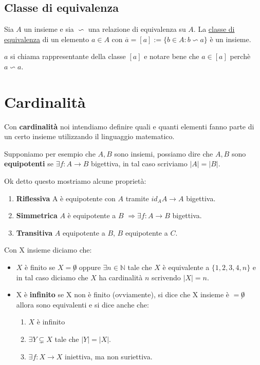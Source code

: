 \documentclass{article}
\theoremstyle{definition}
\begin{document}
\subsection{Classe di equivalenza}
Sia $A$ un insieme e sia $\backsim$ una relazione di equivalenza su $A$. La \underline{classe di equivalenza} di un elemento $a \in A$ con $\overline{a} = [a] := \{b\in A : b \backsim a\}$ è un insieme. \par
$a$ si chiama rappresentante della classe $[a]$ e notare bene che $a \in [a]$ perchè $a \backsim a$.






\newpage
\section{Cardinalità}
Con \textbf{cardinalità} noi intendiamo definire quali e quanti elementi fanno parte di un certo insieme utilizzando il linguaggio matematico. \par

Supponiamo per esempio che $A,B$ sono insiemi, possiamo dire che $A,B$ sono \textbf{equipotenti} se $\exists f:A \rightarrow B$ bigettiva, in tal caso scriviamo $|A| = |B|$. \par

Ok detto questo mostriamo alcune proprietà:
\begin{enumerate}
        \item \textbf{Riflessiva} A è equipotente con $A$ tramite $id_A A \rightarrow A$ bigettiva.
        \item \textbf{Simmetrica} $A$ è equipotente a $B$ $\Rightarrow \exists f:A \rightarrow B$ bigettiva. 
        \item \textbf{Transitiva} $A$ equipotente a $B$, $B$ equipotente a $C$.	
\end{enumerate}

Con X insieme diciamo che:
\begin{itemize}
        \item $X$ è finito se $X = \not 0$ oppure $\exists n \in \mathbb{N}$ tale che $X$ è equivalente a $\{1,2,3,4,n\}$ e in tal caso diciamo che $X$ ha cardinalità $n$ scrivendo $|X| = n$.
        \item X è \textbf{infinito} se X non è finito (ovviamente), si dice che X insieme è $= \not 0$ allora sono equivalenti e si dice anche che:
        \begin{enumerate}
                \item$X$ è infinito
                \item $\exists Y \subsetneq X$ tale che $|Y|=|X|$.
                \item $\exists f:X \to X$ iniettiva, ma non suriettiva.
        \end{enumerate}
\end{itemize}
\end{document}

